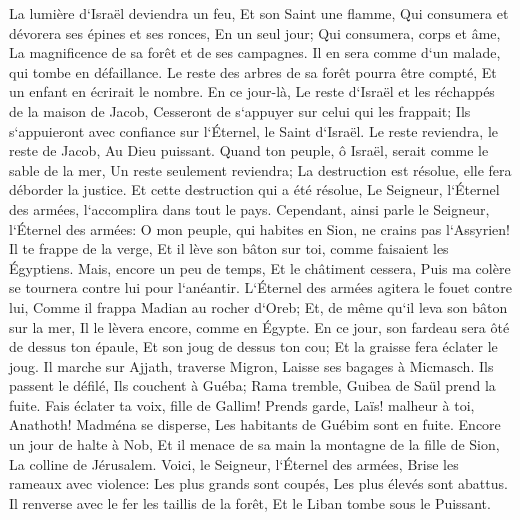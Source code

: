 \verse La lumière d`Israël deviendra un feu, Et son Saint une flamme, Qui consumera et dévorera ses épines et ses ronces, En un seul jour; 
\verse Qui consumera, corps et âme, La magnificence de sa forêt et de ses campagnes. Il en sera comme d`un malade, qui tombe en défaillance. 
\verse Le reste des arbres de sa forêt pourra être compté, Et un enfant en écrirait le nombre. 
\verse En ce jour-là, Le reste d`Israël et les réchappés de la maison de Jacob, Cesseront de s`appuyer sur celui qui les frappait; Ils s`appuieront avec confiance sur l`Éternel, le Saint d`Israël. 
\verse Le reste reviendra, le reste de Jacob, Au Dieu puissant. 
\verse Quand ton peuple, ô Israël, serait comme le sable de la mer, Un reste seulement reviendra; La destruction est résolue, elle fera déborder la justice. 
\verse Et cette destruction qui a été résolue, Le Seigneur, l`Éternel des armées, l`accomplira dans tout le pays. 
\verse Cependant, ainsi parle le Seigneur, l`Éternel des armées: O mon peuple, qui habites en Sion, ne crains pas l`Assyrien! Il te frappe de la verge, Et il lève son bâton sur toi, comme faisaient les Égyptiens. 
\verse Mais, encore un peu de temps, Et le châtiment cessera, Puis ma colère se tournera contre lui pour l`anéantir. 
\verse L`Éternel des armées agitera le fouet contre lui, Comme il frappa Madian au rocher d`Oreb; Et, de même qu`il leva son bâton sur la mer, Il le lèvera encore, comme en Égypte. 
\verse En ce jour, son fardeau sera ôté de dessus ton épaule, Et son joug de dessus ton cou; Et la graisse fera éclater le joug. 
\verse Il marche sur Ajjath, traverse Migron, Laisse ses bagages à Micmasch. 
\verse Ils passent le défilé, Ils couchent à Guéba; Rama tremble, Guibea de Saül prend la fuite. 
\verse Fais éclater ta voix, fille de Gallim! Prends garde, Laïs! malheur à toi, Anathoth! 
\verse Madména se disperse, Les habitants de Guébim sont en fuite. 
\verse Encore un jour de halte à Nob, Et il menace de sa main la montagne de la fille de Sion, La colline de Jérusalem. 
\verse Voici, le Seigneur, l`Éternel des armées, Brise les rameaux avec violence: Les plus grands sont coupés, Les plus élevés sont abattus. 
\verse Il renverse avec le fer les taillis de la forêt, Et le Liban tombe sous le Puissant. 

